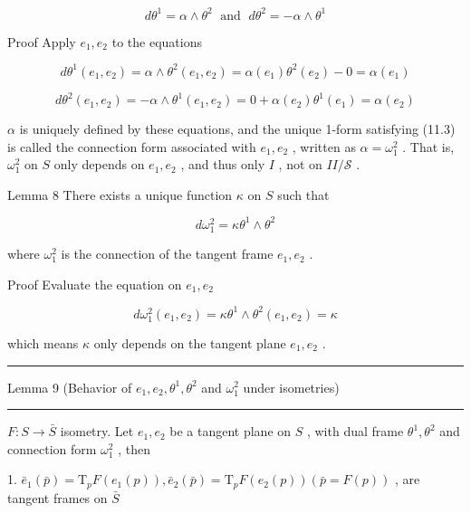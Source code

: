 \documentclass[lang=cn,a4paper,11pt,openany,twoside]{elegantbook}
\newcommand{\HRule}{\begin{center}\rule{0.9\linewidth}{0.2mm}\end{center}}
\begin{document}
\[
d{\theta }^{1} = \alpha  \land  {\theta }^{2}\;\text{ and }\;d{\theta }^{2} =  - \alpha  \land  {\theta }^{1} \tag{11.3}
\]

Proof Apply \({e}_{1},{e}_{2}\) to the equations

\[
d{\theta }^{1}\left( {{e}_{1},{e}_{2}}\right)  = \alpha  \land  {\theta }^{2}\left( {{e}_{1},{e}_{2}}\right)  = \alpha \left( {e}_{1}\right) {\theta }^{2}\left( {e}_{2}\right)  - 0 = \alpha \left( {e}_{1}\right)
\]

\[
d{\theta }^{2}\left( {{e}_{1},{e}_{2}}\right)  =  - \alpha  \land  {\theta }^{1}\left( {{e}_{1},{e}_{2}}\right)  = 0 + \alpha \left( {e}_{2}\right) {\theta }^{1}\left( {e}_{1}\right)  = \alpha \left( {e}_{2}\right)
\]

\(\alpha\) is uniquely defined by these equations, and the unique 1-form satisfying (11.3) is called the connection form associated with \({e}_{1},{e}_{2}\) , written as \(\alpha  = {\omega }_{1}^{2}\) . That is, \({\omega }_{1}^{2}\) on \(S\) only depends on \({e}_{1},{e}_{2}\) , and thus only \(I\) , not on \({II}/\mathcal{S}\) .

Lemma 8 There exists a unique function \(\kappa\) on \(S\) such that

\[
d{\omega }_{1}^{2} = \kappa {\theta }^{1} \land  {\theta }^{2}
\]

where \({\omega }_{1}^{2}\) is the connection of the tangent frame \({e}_{1},{e}_{2}\) .

Proof Evaluate the equation on \({e}_{1},{e}_{2}\)

\[
d{\omega }_{1}^{2}\left( {{e}_{1},{e}_{2}}\right)  = \kappa {\theta }^{1} \land  {\theta }^{2}\left( {{e}_{1},{e}_{2}}\right)  = \kappa
\]

which means \(\kappa\) only depends on the tangent plane \({e}_{1},{e}_{2}\) .

\HRule

Lemma 9 (Behavior of \({e}_{1},{e}_{2},{\theta }^{1},{\theta }^{2}\) and \({\omega }_{1}^{2}\) under isometries)

\HRule

\(F : S \rightarrow  \bar{S}\) isometry. Let \({e}_{1},{e}_{2}\) be a tangent plane on \(S\) , with dual frame \({\theta }^{1},{\theta }^{2}\) and connection form \({\omega }_{1}^{2}\) , then

1. \({\bar{e}}_{1}\left( \bar{p}\right)  = {\mathrm{T}}_{p}F\left( {{e}_{1}\left( p\right) }\right) ,{\bar{e}}_{2}\left( \bar{p}\right)  = {\mathrm{T}}_{p}F\left( {{e}_{2}\left( p\right) }\right) \left( {\bar{p} = F\left( p\right) }\right)\) , are tangent frames on \(\bar{S}\)
\end{document}
